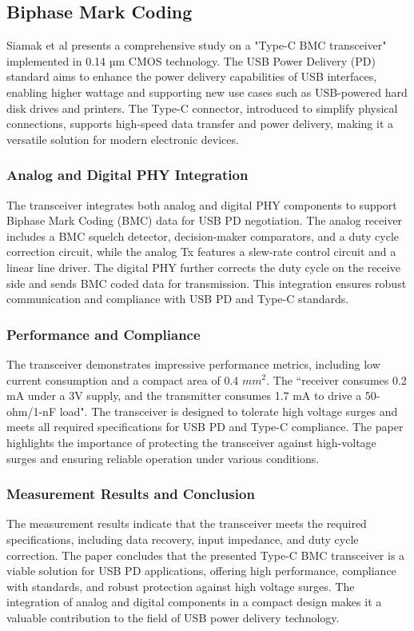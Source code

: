 \subsection{Biphase Mark Coding}

Siamak et al\cite{2019bmc} presents a comprehensive study on a "Type-C BMC transceiver" implemented in 0.14 µm CMOS technology. The USB Power Delivery (PD) standard aims to enhance the power delivery capabilities of USB interfaces, enabling higher wattage and supporting new use cases such as USB-powered hard disk drives and printers. The Type-C connector, introduced to simplify physical connections, supports high-speed data transfer and power delivery, making it a versatile solution for modern electronic devices.

\subsubsection{Analog and Digital PHY Integration}
The transceiver integrates both analog and digital PHY components to support Biphase Mark Coding (BMC) data for USB PD negotiation. The analog receiver includes a BMC squelch detector, decision-maker comparators, and a duty cycle correction circuit, while the analog Tx features a slew-rate control circuit and a linear line driver. The digital PHY further corrects the duty cycle on the receive side and sends BMC coded data for transmission. This integration ensures robust communication and compliance with USB PD and Type-C standards.

\subsubsection{Performance and Compliance}
The transceiver demonstrates impressive performance metrics, including low current consumption and a compact area of 0.4 \(mm^{2}\). The “receiver consumes 0.2 mA under a 3V supply, and the transmitter consumes 1.7 mA to drive a 50-ohm/1-nF load". The transceiver is designed to tolerate high voltage surges and meets all required specifications for USB PD and Type-C compliance. The paper highlights the importance of protecting the transceiver against high-voltage surges and ensuring reliable operation under various conditions.

\subsubsection{Measurement Results and Conclusion}
The measurement results indicate that the transceiver meets the required specifications, including data recovery, input impedance, and duty cycle correction. The paper concludes that the presented Type-C BMC transceiver is a viable solution for USB PD applications, offering high performance, compliance with standards, and robust protection against high voltage surges. The integration of analog and digital components in a compact design makes it a valuable contribution to the field of USB power delivery technology.

